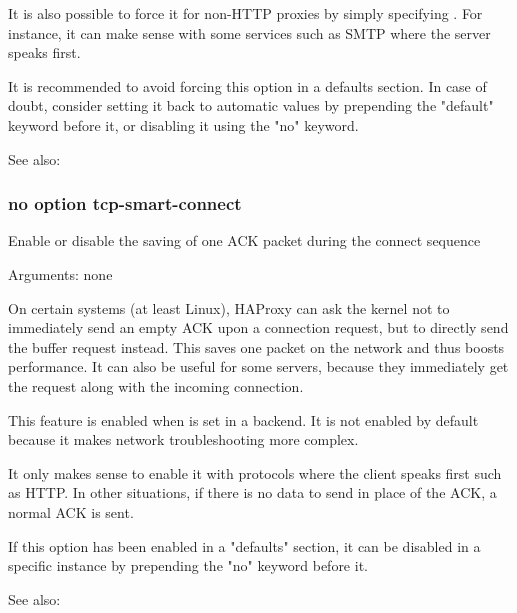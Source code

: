   It is also possible to force it for non-HTTP proxies by simply specifying
  . For instance, it can make sense with some services
  such as SMTP where the server speaks first.

  It is recommended to avoid forcing this option in a defaults section. In case
  of doubt, consider setting it back to automatic values by prepending the
  "default" keyword before it, or disabling it using the "no" keyword.


See also: 

\subsubsection[tcp-smart-accept]{}
\subsubsection*{no option tcp-smart-connect}


  Enable or disable the saving of one ACK packet during the connect sequence


  Arguments: none

  On certain systems (at least Linux), HAProxy can ask the kernel not to
  immediately send an empty ACK upon a connection request, but to directly
  send the buffer request instead. This saves one packet on the network and
  thus boosts performance. It can also be useful for some servers, because they
  immediately get the request along with the incoming connection.

  This feature is enabled when  is set in a backend.
  It is not enabled by default because it makes network troubleshooting more
  complex.

  It only makes sense to enable it with protocols where the client speaks first
  such as HTTP. In other situations, if there is no data to send in place of
  the ACK, a normal ACK is sent.

  If this option has been enabled in a "defaults" section, it can be disabled
  in a specific instance by prepending the "no" keyword before it.


See also: 

\subsubsection[tcpka]{}

